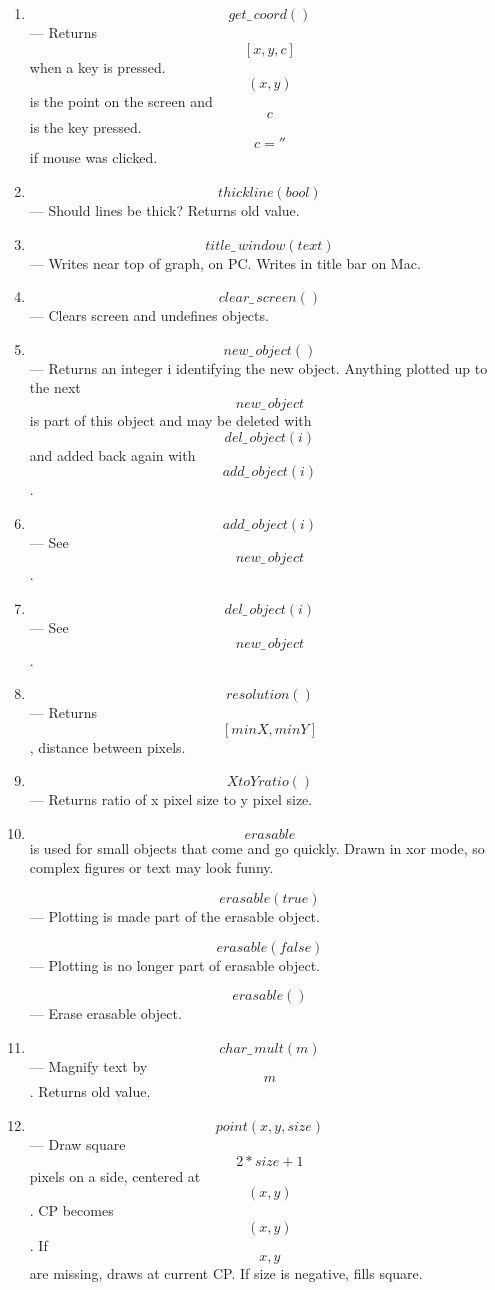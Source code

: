 {\begin{enumerate}
\item \[get\_\,coord()\] ---
     Returns \[[x,y,c]\] when a key is pressed.  \[(x,y)\] is the point
                on the screen and \[c\] is the key pressed.  \[c=''\] if mouse
                was clicked.

\item \[thickline(bool)\] ---
 Should lines be thick?  Returns old value.

\item \[title\_\,window(text)\] ---
                Writes near top of graph, on PC.  Writes in title bar
                on Mac.


\item \[clear\_\,screen()\] ---
    Clears screen and undefines objects.

\item \[new\_\,object()\] ---
      Returns an integer i identifying the new object.
                  Anything plotted up to the next \[new\_\,object\] is
                  part of this object and may be deleted with
                  \[del\_\,object(i)\] and  added back again with
		  \[add\_\,object(i)\]. 

\item \[add\_\,object(i)\] --- See \[new\_\,object\].

\item \[del\_\,object(i)\] --- See \[new\_\,object\].

\item \[resolution()\] ---
      Returns \[[minX,minY]\], distance between pixels.

\item \[XtoYratio()\] ---
       Returns ratio of x pixel size to y pixel size.

\item
    \[erasable\] is used for small objects that come and go quickly.
    Drawn in xor mode, so complex figures or text may look funny.
	
    \[erasable(true)\] --- Plotting is made part of the erasable object.

   \[erasable(false)\] --- Plotting is no longer part of erasable object.

   \[erasable()\] ---     Erase erasable object.


\item \[char\_\,mult(m)\] ---
      Magnify text by  \[m\].  Returns old value.

\item \[point(x,y,size)\] ---
   Draw square \[2*size+1\] pixels on a side, centered
                  at \[(x,y)\].  CP becomes \[(x,y)\].
		  If \[x,y\] are missing, draws at
                  current CP.  If size is negative, fills square.


\end{enumerate}}
